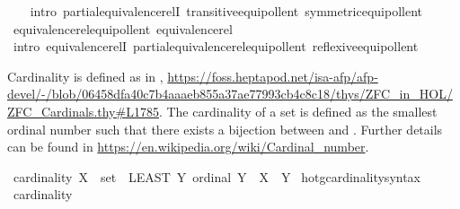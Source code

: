 \begin{isabellebody}
%
\isadelimproof
\ \ %
\endisadelimproof
%
\isatagproof
{}\isamarkupfalse%
\ {\isacharparenleft}{\kern0pt}intro\ partial{\isacharunderscore}{\kern0pt}equivalence{\isacharunderscore}{\kern0pt}relI\ transitive{\isacharunderscore}{\kern0pt}equipollent\ symmetric{\isacharunderscore}{\kern0pt}equipollent{\isacharparenright}{\kern0pt}%
\endisatagproof
{\isafoldproof}%
%
\isadelimproof
\isanewline
%
\endisadelimproof
\isanewline
{}\isamarkupfalse%
\ equivalence{\isacharunderscore}{\kern0pt}rel{\isacharunderscore}{\kern0pt}equipollent{\isacharcolon}{\kern0pt}\ {\isachardoublequoteopen}equivalence{\isacharunderscore}{\kern0pt}rel\ {\isacharparenleft}{\kern0pt}{\isasymapprox}{\isacharparenright}{\kern0pt}{\isachardoublequoteclose}\isanewline
%
\isadelimproof
\ \ %
\endisadelimproof
%
\isatagproof
{}\isamarkupfalse%
\ {\isacharparenleft}{\kern0pt}intro\ equivalence{\isacharunderscore}{\kern0pt}relI\ partial{\isacharunderscore}{\kern0pt}equivalence{\isacharunderscore}{\kern0pt}rel{\isacharunderscore}{\kern0pt}equipollent\ reflexive{\isacharunderscore}{\kern0pt}equipollent{\isacharparenright}{\kern0pt}%
\endisatagproof
{\isafoldproof}%
%
\isadelimproof
%
\endisadelimproof
%
\isadelimdocument
%
\endisadelimdocument
%
\isatagdocument
%
\isamarkuptrue%
%
\endisatagdocument
{\isafolddocument}%
%
\isadelimdocument
%
\endisadelimdocument
%
\begin{isamarkuptext}%
Cardinality is defined as in \cite{ZFC_in_HOL_AFP},
\url{https://foss.heptapod.net/isa-afp/afp-devel/-/blob/06458dfa40c7b4aaaeb855a37ae77993cb4c8c18/thys/ZFC_in_HOL/ZFC_Cardinals.thy\#L1785}.
The cardinality of a set  is defined as the smallest ordinal number \isa{{\isasymalpha}} such that there 
exists a bijection between  and \isa{{\isasymalpha}}.
Further details can be found in \url{https://en.wikipedia.org/wiki/Cardinal_number}.%
\end{isamarkuptext}\isamarkuptrue%
\isamarkupfalse%
\ {\isachardoublequoteopen}cardinality\ {\isacharparenleft}{\kern0pt}X\ {\isacharcolon}{\kern0pt}{\isacharcolon}{\kern0pt}\ set{\isacharparenright}{\kern0pt}\ {\isasymequiv}\ {\isacharparenleft}{\kern0pt}LEAST\ Y{\isachardot}{\kern0pt}\ ordinal\ Y\ {\isasymand}\ X\ {\isasymapprox}\ Y{\isacharparenright}{\kern0pt}{\isachardoublequoteclose}\isanewline
\isanewline
{}\isamarkupfalse%
\ hotg{\isacharunderscore}{\kern0pt}cardinality{\isacharunderscore}{\kern0pt}syntax\ \ \isamarkupfalse%
\ cardinality\ {\isacharparenleft}{\kern0pt}{\isachardoublequoteopen}{\isacharbar}{\kern0pt}{\isacharunderscore}{\kern0pt}{\isacharbar}{\kern0pt}{\isachardoublequoteclose}{\isacharparenright}{\kern0pt}\ \isamarkupfalse%

\end{isabellebody}

